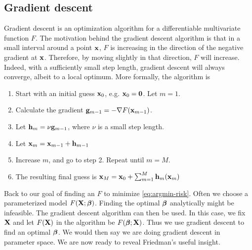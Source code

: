 \subsection{Gradient descent}
Gradient descent is an optimization algorithm for a differentiable multivariate function $F$. The motivation behind the gradient descent algorithm is that in a small interval around a point $\mathbf{x}$, $F$ is increasing in the direction of the negative gradient at $\mathbf{x}$. Therefore, by moving slightly in that direction, $F$ will increase. Indeed, with a sufficiently small step length, gradient descent will always converge, albeit to a local optimum. More formally, the algorithm is
\begin{enumerate}
    \item Start with an initial guess $\mathbf{x}_0$, e.g. $\mathbf{x}_0=\mathbf{0}$. Let $m=1$.
    \item Calculate the gradient $\mathbf{g}_{m-1}=-\nabla F(\mathbf{x}_{m-1})$.
    \item Let $\mathbf{h}_m=\nu \mathbf{g}_{m-1}$, where $\nu$ is a small step length.
    \item Let $\mathbf{x}_m=\mathbf{x}_{m-1}+\mathbf{h}_{m-1}$
    \item Increase $m$, and go to step 2. Repeat until $m=M$.
    \item The resulting final guess is $\mathbf{x}_M=\mathbf{x}_0+\sum_{m=1}^M\mathbf{h}_m(\mathbf{x}_m)$
\end{enumerate}
Back to our goal of finding an $F$ to minimize \eqref{eq:argmin-risk}. Often we choose a parameterized model $F(\mathbf{X};\boldsymbol{\beta})$. Finding the optimal $\boldsymbol{\beta}$ analytically might be infeasible. The gradient descent algorithm can then be used. In this case, we fix $\mathbf{X}$ and let $F(\mathbf{X})$ in the algorithm be $F(\boldsymbol{\beta};\mathbf{X})$. Thus we use gradient descent to find an optimal $\boldsymbol{\beta}$. We would then say we are doing gradient descent in parameter space. We are now ready to reveal Friedman's useful insight.

